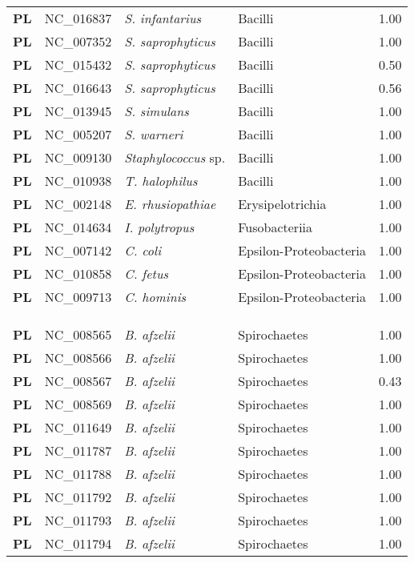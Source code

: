 \begin{adjustwidth}{-3cm}{2cm}
{\begin{supertabular}{>{\bfseries}l|p{0.1\textwidth}p{0.14\textwidth}l|l}
PL & NC\_016837 & \textit{S. infantarius} & Bacilli & 1.00\\
PL & NC\_007352 & \textit{S. saprophyticus} & Bacilli & 1.00\\
PL & NC\_015432 & \textit{S. saprophyticus} & Bacilli & 0.50\\
PL & NC\_016643 & \textit{S. saprophyticus} & Bacilli & 0.56\\
PL & NC\_013945 & \textit{S. simulans} & Bacilli & 1.00\\
PL & NC\_005207 & \textit{S. warneri} & Bacilli & 1.00\\
PL & NC\_009130 & \textit{Staphylococcus} sp. & Bacilli & 1.00\\
PL & NC\_010938 & \textit{T. halophilus} & Bacilli & 1.00\\
PL & NC\_002148 & \textit{E. rhusiopathiae} & Erysipelotrichia & 1.00\\
PL & NC\_014634 & \textit{I. polytropus} & Fusobacteriia & 1.00\\
PL & NC\_007142 & \textit{C. coli} & Epsilon-Proteobacteria & 1.00\\
PL & NC\_010858 & \textit{C. fetus} & Epsilon-Proteobacteria & 1.00\\
PL & NC\_009713 & \textit{C. hominis} & Epsilon-Proteobacteria & 1.00\\
\\
\\
\hline\\
PL & NC\_008565 & \textit{B. afzelii} &  Spirochaetes & 1.00\\
PL & NC\_008566 & \textit{B. afzelii} &  Spirochaetes & 1.00\\
PL & NC\_008567 & \textit{B. afzelii} &  Spirochaetes & 0.43\\
PL & NC\_008569 & \textit{B. afzelii} &  Spirochaetes & 1.00\\
PL & NC\_011649 & \textit{B. afzelii} &  Spirochaetes & 1.00\\
PL & NC\_011787 & \textit{B. afzelii} &  Spirochaetes & 1.00\\
PL & NC\_011788 & \textit{B. afzelii} &  Spirochaetes & 1.00\\
PL & NC\_011792 & \textit{B. afzelii} &  Spirochaetes & 1.00\\
PL & NC\_011793 & \textit{B. afzelii} &  Spirochaetes & 1.00\\
PL & NC\_011794 & \textit{B. afzelii} &  Spirochaetes & 1.00\\

\end{supertabular}}
\end{adjustwidth}
